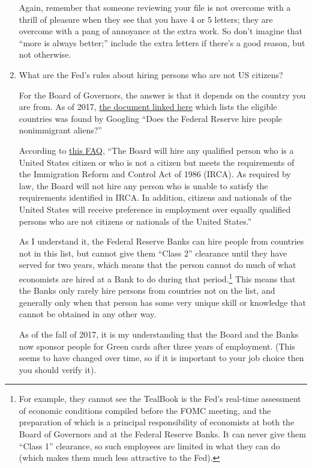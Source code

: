 \documentclass{econtex}
\begin{document}
\begin{enumerate}
Again, remember that someone reviewing your file is not overcome with
a thrill of pleasure when they see that you have 4 or 5 letters; they
are overcome with a pang of annoyance at the extra work.  So don't
imagine that ``more is always better;'' include the extra letters if
there's a good reason, but not otherwise.

\item {}  What are the Fed's rules about hiring persons who are not US citizens?

  For the Board of Governors, the answer is that it depends on the country you are from.  As of 2017, \href{https://www.federalreserve.gov/boarddocs/srletters/2006/SR0614a3.pdf}{the document linked here} which lists the eligible countries was found by Googling ``Does the Federal Reserve hire people nonimmigrant aliens?'' 

    According to \href{https://www.federalreserve.gov/careers-faqs.htm}{this FAQ}, ``The Board will hire any qualified person who is a United States citizen or who is not a citizen but meets the requirements of the Immigration Reform and Control Act of 1986 (IRCA).  As required by law, the Board will not hire any person who is unable to satisfy the requirements identified in IRCA. In addition, citizens and nationals of the United States will receive preference in employment over equally qualified persons who are not citizens or nationals of the United States.''

      As I understand it, the Federal Reserve Banks can hire people from countries not in this list, but cannot give them ``Class 2'' clearance until they have served for two years, which means that the person cannot do much of what economists are hired at a Bank to do during that period.\footnote{For example, they cannot see the TealBook is the Fed's real-time assessment of economic conditions compiled before the FOMC meeting, and the preparation of which is a principal responsibility of economists at both the Board of Governors and at the Federal Reserve Banks.  It can never give them ``Class 1'' clearance, so such employees are limited in what they can do (which makes them much less attractive to the Fed).}  This means that the Banks only rarely hire persons from countries not on the list, and generally only when that person has some very unique skill or knowledge that cannot be obtained in any other way.

     As of the fall of 2017, it is my understanding that the Board and the Banks now sponsor people for Green cards after three years of employment.  (This seems to have changed over time, so if it is important to your job choice then you should verify it).


\end{enumerate}
\end{document}
